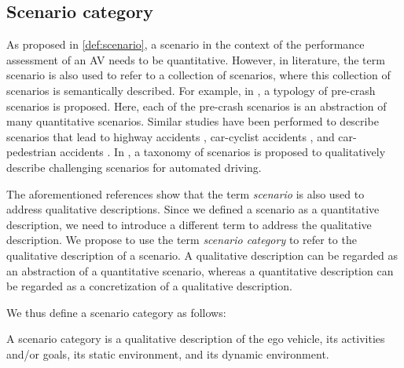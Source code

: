 \cbstartd
\subsection{Scenario category}
\label{sec:scenario category}
\cbend

\cbstart
As proposed in \cref{def:scenario}, a scenario in the context of the performance assessment of an AV needs to be quantitative. 
However, in literature, the term scenario is also used to refer to a collection of scenarios, where this collection of scenarios is semantically described. For example, in \cite{USDoT2007precrashscenarios}, a typology of pre-crash scenarios is proposed. Here, each of the pre-crash scenarios is an abstraction of many quantitative scenarios. Similar studies have been performed to describe scenarios that lead to highway accidents \cite{adaptive2017d73}, car-cyclist accidents \cite{opdencamp2014cats}, and car-pedestrian accidents \cite{lenard2011typical}. In \cite{catapult2017taxonomy}, a taxonomy of scenarios is proposed to qualitatively describe challenging scenarios for automated driving.

The aforementioned references \cite{USDoT2007precrashscenarios, adaptive2017d73, opdencamp2014cats, lenard2011typical, catapult2017taxonomy} show that the term \emph{scenario} is also used to address qualitative descriptions. Since we defined a scenario as a quantitative description, we need to introduce a different term to address the qualitative description. We propose to use the term \emph{scenario category} to refer to the qualitative description of a scenario. A qualitative description can be regarded as an abstraction of a quantitative scenario, \cbstartb whereas a quantitative description can be regarded as a concretization of a qualitative description.
\cbend

We thus define a scenario category as follows:
\begin{definition} \label{def:scenario category}
	A scenario category is a qualitative description of the ego vehicle, its activities and/or goals, its static environment, and its dynamic environment.
\end{definition}

